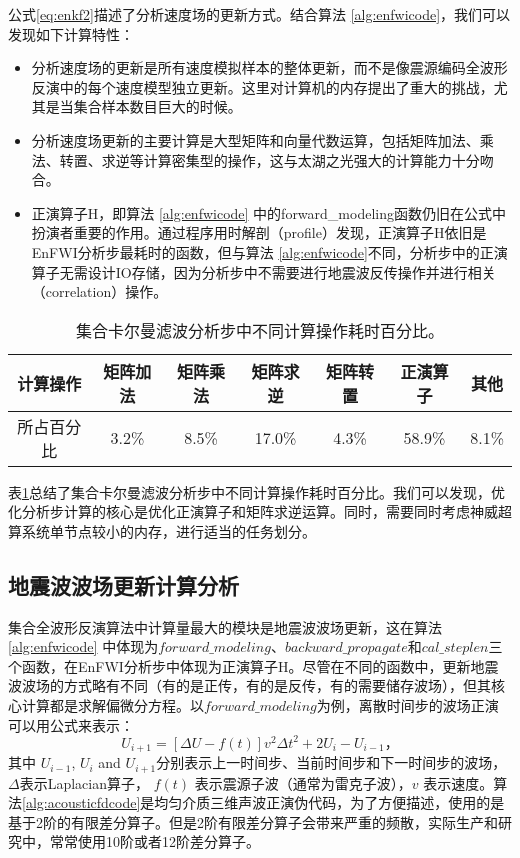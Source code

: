 公式\ref{eq:enkf2}描述了分析速度场的更新方式。结合算法 \ref{alg:enfwicode}，我们可以发现如下计算特性：
\begin{itemize}
  \item 分析速度场的更新是所有速度模拟样本的整体更新，而不是像震源编码全波形反演中的每个速度模型独立更新。这里对计算机的内存提出了重大的挑战，尤其是当集合样本数目巨大的时候。
  \item 分析速度场更新的主要计算是大型矩阵和向量代数运算，包括矩阵加法、乘法、转置、求逆等计算密集型的操作，这与太湖之光强大的计算能力十分吻合。
  \item 正演算子$\mbox{H}$，即算法 \ref{alg:enfwicode} 中的forward\_modeling函数仍旧在公式中扮演者重要的作用。通过程序用时解剖（profile）发现，正演算子$\mbox{H}$依旧是EnFWI分析步最耗时的函数，但与算法 \ref{alg:enfwicode}不同，分析步中的正演算子无需设计IO存储，因为分析步中不需要进行地震波反传操作并进行相关（correlation）操作。
\end{itemize}

\begin{table}[ht]
\centering
\caption{集合卡尔曼滤波分析步中不同计算操作耗时百分比。}
\label{tb:enkfprofile}
\begin{tabular}{ccccccc}
\hline
计算操作  & 矩阵加法  & 矩阵乘法  & 矩阵求逆   & 矩阵转置  & 正演算子   & 其他    \\\hline
所占百分比 & 3.2\% & 8.5\% & 17.0\% & 4.3\% & 58.9\% & 8.1\% \\\hline
\end{tabular}
\end{table}
表\ref{tb:enkfprofile}总结了集合卡尔曼滤波分析步中不同计算操作耗时百分比。我们可以发现，优化分析步计算的核心是优化正演算子和矩阵求逆运算。同时，需要同时考虑神威超算系统单节点较小的内存，进行适当的任务划分。

\subsection{地震波波场更新计算分析}
集合全波形反演算法中计算量最大的模块是地震波波场更新，这在算法 \ref{alg:enfwicode} 中体现为$forward\_modeling$、$backward\_propagate$和$cal\_steplen$三个函数，在EnFWI分析步中体现为正演算子$\mbox{H}$。尽管在不同的函数中，更新地震波波场的方式略有不同（有的是正传，有的是反传，有的需要储存波场），但其核心计算都是求解偏微分方程。以$forward\_modeling$为例，离散时间步的波场正演可以用公式来表示：
\begin{equation}
\label{eq:enfwifd}
U_{i+1} = \left[ \Delta U -f(t) \right] v^2 \Delta t^2 + 2 U_{i} - U_{i-1}，
\end{equation}
其中 $U_{i-1}$, $U_{i}$ and $U_{i+1}$分别表示上一时间步、当前时间步和下一时间步的波场，$\Delta$表示Laplacian算子，
$f(t)$ 表示震源子波（通常为雷克子波），$v$ 表示速度。算法\ref{alg:acousticfdcode}是均匀介质三维声波正演伪代码，为了方便描述，使用的是基于2阶的有限差分算子\cite{fu2011eliminating}。但是2阶有限差分算子会带来严重的频散，实际生产和研究中，常常使用10阶或者12阶差分算子。



